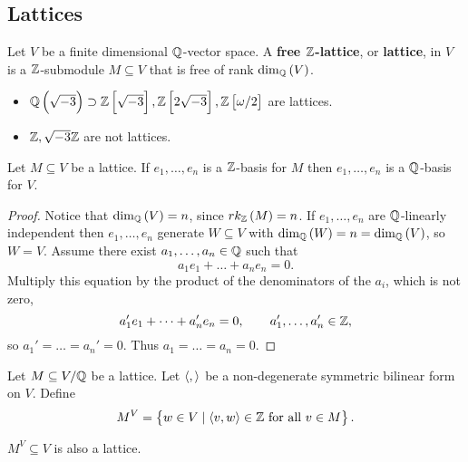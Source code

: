 \pagebreak

\subsection{Lattices}


\begin{definition}
Let $ V $ be a finite dimensional $ \mathbb{Q} $-vector space. A \textbf{free $ \mathbb{Z} $-lattice}, or \textbf{lattice}, in $ V $ is a $ \mathbb{Z} $-submodule $ M \subseteq V $ that is free of rank $ \dim_\Q\br{V} $.
\end{definition}

\begin{example*}
\hfill
\begin{itemize}
\item $ \Q\br{\sqrt{-3}} \supset \Z\sbr{\sqrt{-3}}, \Z\sbr{2\sqrt{-3}}, \Z\sbr{\omega / 2} $ are lattices.
\item $ \mathbb{Z}, \sqrt{-3}\mathbb{Z} $ are not lattices.
\end{itemize}
\end{example*}

\begin{lemma}
Let $ M \subseteq V $ be a lattice. If $ e_1, \dots, e_n $ is a $ \mathbb{Z} $-basis for $ M $ then $ e_1, \dots, e_n $ is a $ \mathbb{Q} $-basis for $ V $.
\end{lemma}

\begin{proof}
Notice that $ \dim_\Q\br{V} = n $, since $ rk_\Z\br{M} = n $. If $ e_1, \dots, e_n $ are $ \mathbb{Q} $-linearly independent then $ e_1, \dots, e_n $ generate $ W \subseteq V $ with $ \dim_\Q\br{W} = n = \dim_\Q\br{V} $, so $ W = V $. Assume there exist $ a_1, \dots, a_n \in \mathbb{Q} $ such that
$$ a_1e_1 + \dots + a_ne_n = 0. $$
Multiply this equation by the product of the denominators of the $ a_i $, which is not zero,
$$ a_1'e_1 + \dots + a_n'e_n = 0, \qquad a_1', \dots, a_n' \in \mathbb{Z}, $$
so $ a_1' = \dots = a_n' = 0 $. Thus $ a_1 = \dots = a_n = 0 $.
\end{proof}

Let $ M \subseteq V / \mathbb{Q} $ be a lattice. Let $ \left\langle , \right\rangle $ be a non-degenerate symmetric bilinear form on $ V $. Define
$$ M^V = \cbr{w \in V \mid \abr{v, w} \in \Z \ \text{for all} \ v \in M}. $$

\begin{proposition}
\label{prop:duallattice}
$ M^V \subseteq V $ is also a lattice.
\end{proposition}

